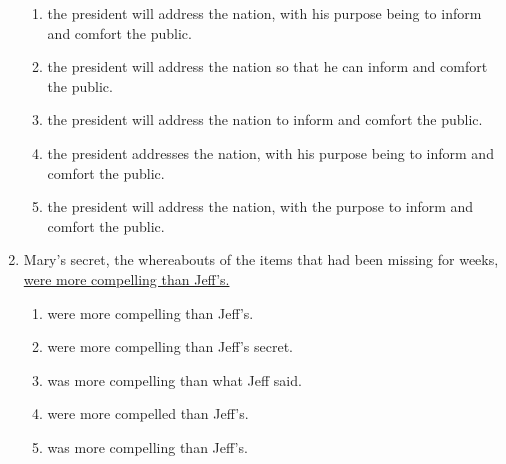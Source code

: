 \begin{enumerate}
\bigskip
\begin{enumerate}[label=(\Alph*)]
\item the president will address the nation, with his purpose being to inform and comfort the public. \hrulefill
\item the president will address the nation so that he can inform and comfort the public.\hrulefill
\item the president will address the nation to inform and comfort the public.\hrulefill
\item the president addresses the nation, with his purpose being to inform and comfort the public.\hrulefill
\item the president will address the nation, with the purpose to inform and comfort the public.\hrulefill
\end{enumerate}

\bigskip
\item Mary's secret, the whereabouts of the items that had been missing for weeks, \ul{were more compelling than Jeff's.}

\bigskip
\begin{enumerate}[label=(\Alph*)]
\item were more compelling than Jeff's. \hrulefill
\item were more compelling than Jeff's secret. \hrulefill
\item was more compelling than what Jeff said. \hrulefill
\item were more compelled than Jeff's. \hrulefill
\item was more compelling than Jeff's.\hrulefill
\end{enumerate}

\end{enumerate}
